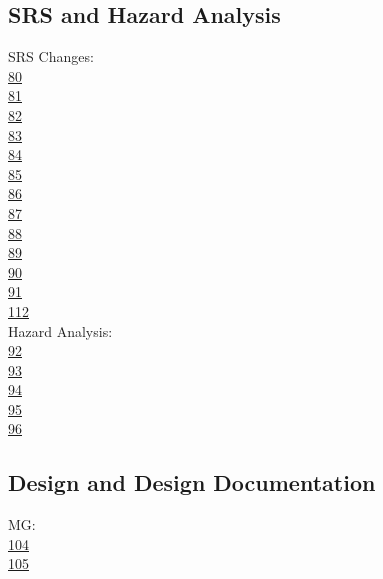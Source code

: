 \documentclass{article}
\begin{document}
\subsection{SRS and Hazard Analysis}

SRS Changes:\\
\href{https://github.com/takhtart/PCD/issues/80}{80}\\
\href{https://github.com/takhtart/PCD/issues/81}{81}\\
\href{https://github.com/takhtart/PCD/issues/82}{82}\\
\href{https://github.com/takhtart/PCD/issues/83}{83}\\
\href{https://github.com/takhtart/PCD/issues/84}{84}\\
\href{https://github.com/takhtart/PCD/issues/85}{85}\\
\href{https://github.com/takhtart/PCD/issues/86}{86}\\
\href{https://github.com/takhtart/PCD/issues/87}{87}\\
\href{https://github.com/takhtart/PCD/issues/88}{88}\\
\href{https://github.com/takhtart/PCD/issues/89}{89}\\
\href{https://github.com/takhtart/PCD/issues/90}{90}\\
\href{https://github.com/takhtart/PCD/issues/91}{91}\\
\href{https://github.com/takhtart/PCD/issues/112}{112}\\

Hazard Analysis:\\

\href{https://github.com/takhtart/PCD/issues/92}{92}\\
\href{https://github.com/takhtart/PCD/issues/93}{93}\\
\href{https://github.com/takhtart/PCD/issues/94}{94}\\
\href{https://github.com/takhtart/PCD/issues/95}{95}\\
\href{https://github.com/takhtart/PCD/issues/96}{96}\\


\subsection{Design and Design Documentation}

MG:\\
\href{https://github.com/takhtart/PCD/issues/104}{104}\\
\href{https://github.com/takhtart/PCD/issues/105}{105}\\
\end{document}
